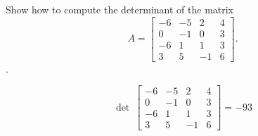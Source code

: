 
\begin{exerciseStatement}


Show how to compute the determinant of the matrix \[A= \left[\begin{array}{cccc}
-6 & -5 & 2 & 4 \\
0 & -1 & 0 & 3 \\
-6 & 1 & 1 & 3 \\
3 & 5 & -1 & 6
\end{array}\right] .\].


\end{exerciseStatement}
    
\begin{exerciseAnswer} 
\[\operatorname{det}\  \left[\begin{array}{cccc}
-6 & -5 & 2 & 4 \\
0 & -1 & 0 & 3 \\
-6 & 1 & 1 & 3 \\
3 & 5 & -1 & 6
\end{array}\right] = -93 \]
\end{exerciseAnswer}
    
